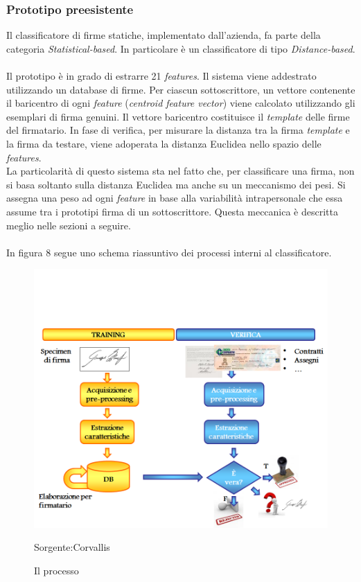 \subsubsection{Prototipo preesistente}
\label{2.1.4}
Il classificatore di firme statiche, implementato dall'azienda, fa parte della categoria \emph{Statistical-based}. In particolare è un classificatore di tipo \emph{Distance-based}.\\\\
Il prototipo è in grado di estrarre 21 \emph{features}.
Il sistema viene addestrato utilizzando un database di firme. Per ciascun sottoscrittore, un vettore contenente il baricentro di ogni \emph{feature} (\emph{centroid feature vector}) viene calcolato utilizzando gli esemplari di firma genuini. Il vettore baricentro costituisce il \emph{template} delle firme del firmatario. In fase di verifica, per misurare la distanza tra la firma \emph{template} e la firma da testare, viene adoperata la distanza Euclidea nello spazio delle \emph{features}.\\
La particolarità di questo sistema sta nel fatto che, per classificare una firma, non si basa soltanto sulla distanza Euclidea ma anche su un meccanismo dei pesi. Si assegna una peso ad ogni \emph{feature} in base alla variabilità intrapersonale che essa assume tra i prototipi firma di un sottoscrittore. Questa meccanica è descritta meglio nelle sezioni a seguire.\\\\
In figura 8 segue uno schema riassuntivo dei processi interni al classificatore.
\begin{figure}[H]
\centering
\includegraphics[scale=0.6]{../Logo&Header/processoPrototipoPrees.png}
\caption{Il processo}Sorgente:Corvallis
\end{figure}

